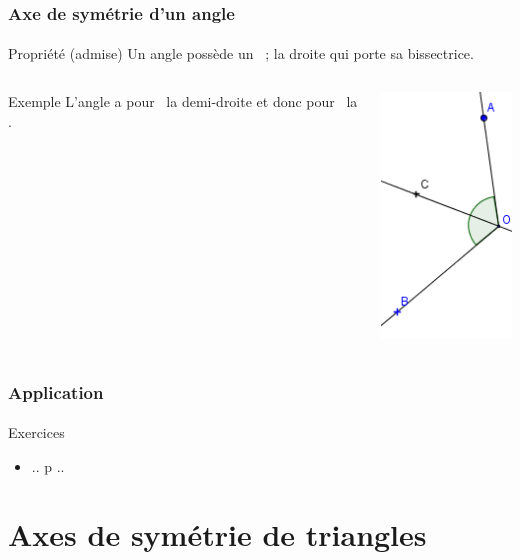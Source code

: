 \documentclass{beamer}
\begin{document}
\begin{frame}
\frametitle{Axe de symétrie d'un angle}  
\framesubtitle{}

\begin{alertblock}{Propriété (admise)}
	Un angle possède un \asym\ ;  la droite qui porte sa bissectrice.\pause
\end{alertblock}

\begin{columns}[c]
	
\begin{column}{7cm}
\begin{exampleblock}{Exemple}
	L'angle  a pour \bissec\ la demi-droite  et donc pour \asym\ la .
\end{exampleblock}
\end{column}

\begin{column}{3cm}
	\includegraphics[scale=0.4]{./img/angle}
\end{column}

\end{columns}
\end{frame}

\begin{frame}
	\frametitle{Application}  
	\framesubtitle{}
	
	\begin{block}{Exercices}
		\begin{itemize}
			\item .. p ..
		\end{itemize}
	\end{block}
\end{frame}

\section{Axes de symétrie de triangles}
\end{document}
